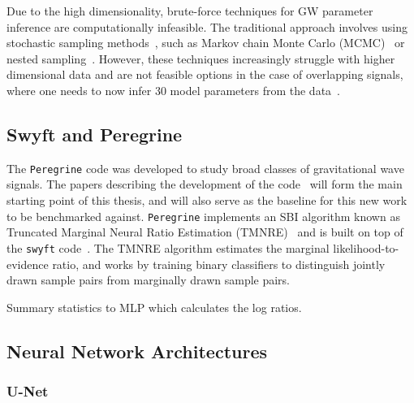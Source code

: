 Due to the high dimensionality, brute-force techniques for GW parameter inference are computationally infeasible. The traditional approach involves using stochastic sampling methods~\cite{Thrane_Talbot_2019}, such as Markov chain Monte Carlo (MCMC)~\cite{Metropolis_1953,Hastings_1970} or nested sampling~\cite{Skilling_2004}. However, these techniques increasingly struggle with higher dimensional data and are not feasible options in the case of overlapping signals, where one needs to now infer 30 model parameters from the data~\cite{alvey2023things}.


\subsection{Swyft and Peregrine}



The \texttt{Peregrine} code was developed to study broad classes of gravitational wave signals. The papers describing the development of the code~\cite{bhardwaj2023peregrine,alvey2023things} will form the main starting point of this thesis, and will also serve as the baseline for this new work to be benchmarked against. \texttt{Peregrine} implements an SBI algorithm known as Truncated Marginal Neural Ratio Estimation (TMNRE)~\cite{Miller_TMNRE_2021} and is built on top of the \texttt{swyft} code~\cite{Miller2022}. The TMNRE algorithm estimates the marginal likelihood-to-evidence ratio, and works by training binary classifiers to distinguish jointly drawn sample pairs from marginally drawn sample pairs.

Summary statistics to MLP which calculates the log ratios.

\subsection{Neural Network Architectures}

\subsubsection{U-Net}

